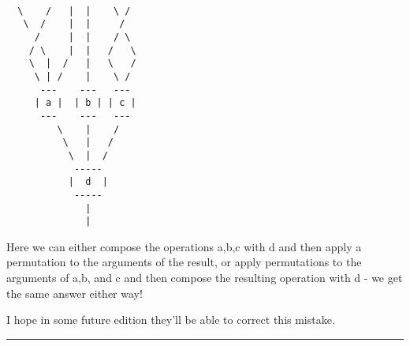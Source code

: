 \begin{verbatim}

  \    /   |  |    \ /  
   \  /    |  |     / 
     /     |  |    / \ 
    / \    |  |   /   \
    \  |  /   |   \   /    
     \ | /    |    \ /    
      ---    ---   ---   
     | a |  | b | | c | 
      ---    ---   --- 
         \    |    /
          \   |   /  
           \  |  / 
            ----- 
           |  d  |  
            -----  
              |   
              |  
\end{verbatim}
    
Here we can either compose the operations a,b,c with d and then
apply a permutation to the arguments of the result, or apply 
permutations to the arguments of a,b, and c and then compose
the resulting operation with d - we get the same answer either way!

I hope in some future edition they'll be able to correct this
mistake.

\par\noindent\rule{\textwidth}{0.4pt}
